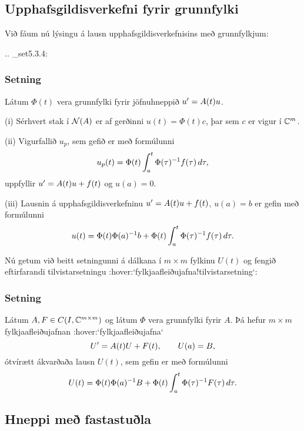 \subsection*{Upphafsgildisverkefni fyrir grunnfylki}

\noindent
Við fáum nú lýsingu á lausn upphafsgildisverkefnisins með
grunnfylkjum:


.. _set5.3.4:

\subsubsection{Setning}
 Látum $\Phi(t)$ vera grunnfylki fyrir jöfnuhneppið $u{\sp{\prime}}
=A(t)u$. 

\noindent
(i)  Sérhvert stak í ${\cal N}(A)$ er af gerðinni $u(t)=\Phi(t)c$, þar
sem $c$ er vigur í ${\mathbb C}\sp m$.

\noindent
(ii) Vigurfallið  $u_p$, sem gefið er með formúlunni
 $$u_p(t)=\Phi(t)\int_a\sp t \Phi(\tau)\sp{-1}f(\tau)\, d\tau,
 $$
uppfyllir $u{\sp{\prime}}=A(t)u+f(t)$ og $u(a)=0$. 

\noindent
(iii)  Lausnin á upphafsgildisverkefninu $u{\sp{\prime}}=A(t)u+f(t)$, $u(a)=b$
er gefin með formúlunni
 $$u(t)=\Phi(t)\Phi(a)\sp{-1}b+
\Phi(t)\int_a\sp t \Phi(\tau)\sp{-1}f(\tau)\, d\tau.
 $$


\medskip
Nú getum við beitt setningunni á dálkana í $m\times m$ fylkinu $U(t)$ og
fengið eftirfarandi
tilvistarsetningu :hover:`fylkjaafleiðujafna!tilvistarsetning`:

\subsubsection{Setning}
Látum $A, F\in C(I,{\mathbb C}\sp {m\times m})$ og látum $\Phi$ vera grunnfylki
fyrir $A$.  Þá hefur $m\times m$
fylkjaafleiðujafnan :hover:`fylkjaafleiðujafna`
 $$U{\sp{\prime}}=A(t)U+F(t), \qquad U(a)=B, 
 $$
ótvírætt ákvarðaða lausn $U(t)$,  sem gefin er með formúlunni
 $$U(t)=\Phi(t)\Phi(a)\sp{-1}B + \Phi(t)\int_a\sp t \Phi(\tau)\sp
{-1}F(\tau) \, d\tau.
 $$


\subsection*{Hneppi með fastastuðla}

